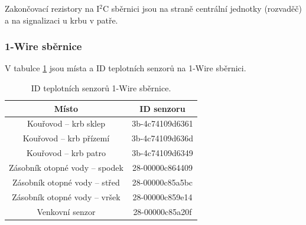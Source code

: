 \begin{Czech}
Zakončovací rezistory na I$^2$C sběrnici jsou na straně centrální jednotky (rozvaděč) a na signalizaci u krbu v patře.
\end{Czech}


\begin{Czech}
\subsubsection{1-Wire sběrnice}
\end{Czech}

\begin{Czech}
V tabulce \ref{tab:1-wire-bus} jsou místa a ID teplotních senzorů na 1-Wire sběrnici.
\end{Czech}

\begin{Czech}
\begin{table}[H]
\centering
\begin{tabular}{|c| c ||} 
 \hline
  Místo & ID senzoru \\ 
 \hline\hline
 Kouřovod – krb sklep & 3b-4c74109d6361 \\ 
 Kouřovod – krb přízemí & 3b-4c74109d636d \\ 
 Kouřovod – krb patro & 3b-4c74109d6349\\ 
 Zásobník otopné vody – spodek & 28-00000c864409 \\ 
 Zásobník otopné vody – střed & 28-00000c85a5bc \\ 
 Zásobník otopné vody – vršek & 28-00000c859e14 \\ 
 Venkovní senzor & 28-00000c85a20f \\ 
 \hline
\end{tabular}
\caption{ID teplotních senzorů 1-Wire sběrnice.}
\label{tab:1-wire-bus}
\end{table}
\end{Czech}